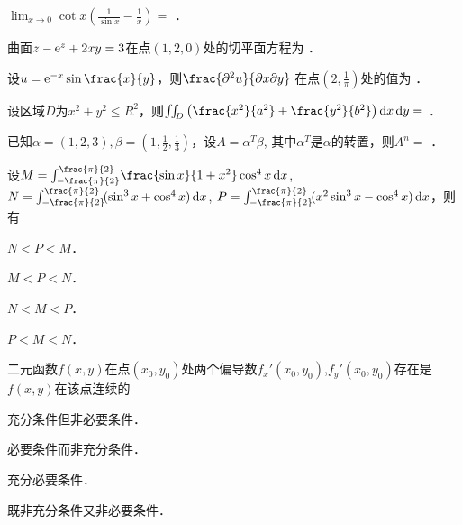 \documentclass[plain,noanswer,medmath]{../../template/jnuexam}
\begin{document}




\begin{problem}
$\lim_{x \to 0} \cot x\left(\frac{1}{\sin x} - \frac{1}{x} \right) =$ \fillin{}．
\end{problem}


\begin{problem}
曲面$z - \mathrm{e}^z + 2xy = 3$在点$(1,2,0)$处的切平面方程为 \fillin{}．
\end{problem}


\begin{problem}
设$u = \e^{-x}\sin \frac{x}{y}$，则$\frac{\pd^2 u}{\pdx\pd y}$
在点$\left(2,\frac{1}{\pi} \right)$处的值为 \fillin{}．
\end{problem}


\begin{problem}
设区域$D$为$x^2 + y^2 \le R^2$，则$\iint_D \left(\frac{x^2}{a^2} + \frac{y^2}{b^2} \right)\dx\dy =$ \fillin{}．
\end{problem}


\begin{problem}
已知$\alpha = (1,2,3),\beta = \left(1,\frac{1}{2},\frac{1}{3}\right)$，设$A = \alpha^T\beta$,
其中$\alpha^T$是$\alpha$的转置，则$A^n =$ \fillin{}．
\end{problem}




\begin{problem}
设$M = \int_{-\frac{\pi}{2}}^{\frac{\pi}{2}} \!\frac{\sin x}{1 + x^2}\cos^4 x\dx$, 
  $N = \int_{-\frac{\pi}{2}}^{\frac{\pi}{2}} \!(\sin^3 x + \cos^4 x)\dx$, \goodbreak 
  $P = \int_{-\frac{\pi}{2}}^{\frac{\pi}{2}} \!(x^2\sin^3 x - \cos^4 x)\dx$，则有\pickout{}
\begin{abcd}
\item $N < P < M$．                        
\item $M < P < N$．
\item $N < M < P$．                        
\item $P < M < N$．
\end{abcd}
\end{problem}


\begin{problem}
二元函数$f(x,y)$在点$(x_0,y_0)$处两个偏导数$f_x'(x_0,y_0)$,$f_y'(x_0,y_0)$存在是$f(x,y)$在该点连续的\pickout{}
\begin{abcd}
\item 充分条件但非必要条件．         
\item 必要条件而非充分条件．
\item 充分必要条件．                 
\item 既非充分条件又非必要条件．
\end{abcd}
\end{problem}
\end{document}
